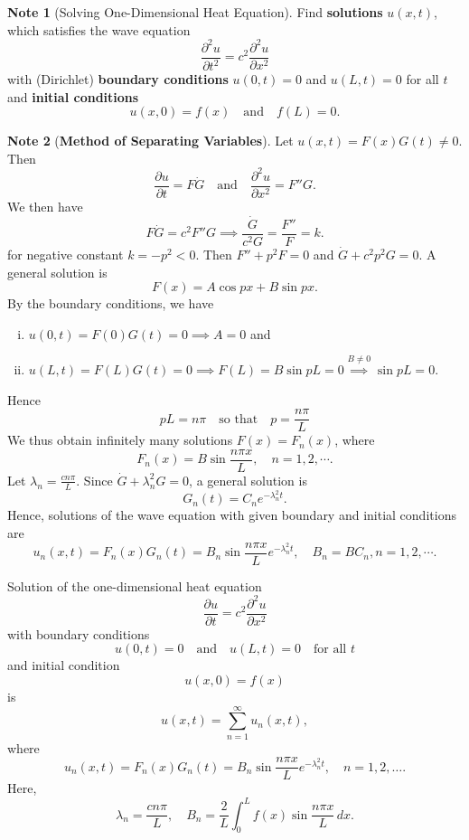 \documentclass[12pt,openany]{book}
\theoremstyle{definition}
\newtheorem*{note}{Note}
\begin{document}
	\begin{note}[Solving One-Dimensional Heat Equation]
		Find \textbf{solutions} \( u(x, t) \), which satisfies the wave equation
		\[
		\frac{\partial^2 u}{\partial t^2} = c^2 \frac{\partial^2 u}{\partial x^2}
		\]
		with (Dirichlet) \textbf{boundary conditions}
		$
		u(0, t) = 0 $ and $u(L, t) = 0$ for all $t
		$
		and \textbf{initial conditions}
		\[
		u(x, 0) = f(x) \quad \text{and} \quad f(L)=0.
		\]
	\end{note}
	\vspace{8pt}
	\begin{note}[\bf Method of Separating Variables]
		Let $u(x, t) = F(x)G(t)\neq 0.$ Then \[
		\frac{\partial u}{\partial t} = F \dot{G} \quad \text{and} \quad \frac{\partial^2 u}{\partial x^2} = F'' G.
		\] We then have \[
		F \dot{G} = c^2 F'' G\implies
		\frac{\dot{G}}{c^2 G} = \frac{F''}{F}=k.
		\] for negative constant $k=-p^2<0$. Then $
		F'' + p^2 F = 0$ and $\dot{G}+c^2p^2G=0.$ A general solution is
		\[
		F(x) = A \cos px + B \sin px.
		\] By the boundary conditions, we have \begin{enumerate}[(i)]
			\item $u(0, t) = F(0)G(t) = 0\implies A=0$ and
			\item $u(L, t) = F(L)G(t) = 0\implies F(L)= B \sin pL = 0\overset{B\neq 0}{\implies} \sin pL = 0$.
		\end{enumerate} Hence
		\[
		pL = n\pi \quad \text{so that} \quad p = \frac{n\pi}{L}
		\] We thus obtain infinitely many solutions \( F(x) = F_n(x) \), where
		\[
		F_n(x) = B\sin \frac{n\pi x}{L}, \quad n = 1,2,\cdots.
		\]
		Let $\lambda_n = \frac{cn\pi}{L}$. Since $\dot{G} + \lambda_n^2 G = 0$, a general solution is
		\[
		G_n(t) = C_ne^{-\lambda_n^2t}.
		\] Hence, solutions of the wave equation with given boundary and initial conditions are
		\[
		u_n(x, t) = F_n(x)G_n(t)=B_n \sin \frac{n\pi x}{L}e^{-\lambda_n^2 t}, \quad B_n=BC_n, n = 1,2,\cdots.
		\]
	\end{note}
	\vspace{8pt}
	\begin{tcolorbox}
		Solution of the one-dimensional heat equation
		\[
		\frac{\partial u}{\partial t} = c^2 \frac{\partial^2 u}{\partial x^2}
		\]
		with boundary conditions
		\[
		u(0, t) = 0 \quad \text{and} \quad u(L, t) = 0 \quad \text{for all } t
		\]
		and initial condition
		\[
		u(x, 0) = f(x)
		\]
		is
		\[
		u(x, t) = \sum_{n=1}^{\infty} u_n(x, t),
		\]
		where
		\[
		u_n(x, t) = F_n(x) G_n(t) = B_n \sin \frac{n\pi x}{L} e^{-\lambda_n^2 t}, \quad n = 1,2,\dots.
		\]
		Here,
		\[
		\lambda_n = \frac{c n \pi}{L}, \quad B_n = \frac{2}{L} \int_{0}^{L} f(x) \sin \frac{n\pi x}{L} \, dx.
		\]
	\end{tcolorbox}
	
\end{document}
